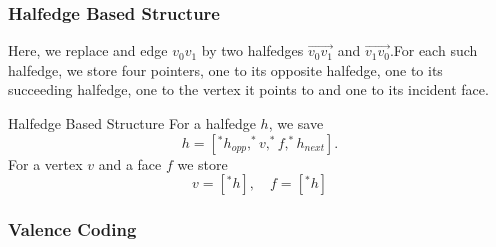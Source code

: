 \documentclass[english]{panikzettel}
\begin{document}
\begin{halfboxl}
\subsubsection*{Halfedge Based Structure}

Here, we replace and edge $v_0 v_1$ by two halfedges $\overrightarrow{v_0 v_1}$ and $\overrightarrow{v_1 v_0}$.For each such halfedge, we store four pointers, one to its opposite halfedge, one to its succeeding halfedge, one to the vertex it points to and one to its incident face.
\end{halfboxl}%
\begin{halfboxr}
\vspace{-\baselineskip}
\begin{defi}{Halfedge Based Structure}
For a halfedge $h$, we save $$h = [^*h_{opp},^*v,^*f,^*h_{next}].$$
For a vertex $v$ and a face $f$ we store $$v = [^*h], \quad f = [^*h]$$
\end{defi}
\end{halfboxr}

\subsubsection*{Valence Coding}
\end{document}
